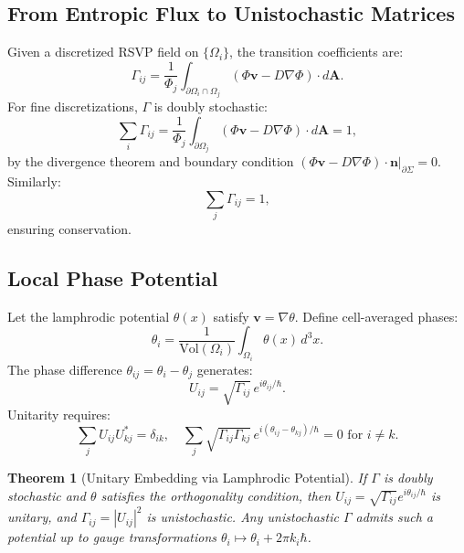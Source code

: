 \documentclass[12pt]{article}
\newtheorem{theorem}{Theorem}
\begin{document}
\subsection{From Entropic Flux to Unistochastic Matrices}

Given a discretized RSVP field on \(\{\Omega_i\}\), the transition coefficients are:
\[
\Gamma_{ij} = \frac{1}{\Phi_j} \int_{\partial \Omega_i \cap \Omega_j} (\Phi \mathbf{v} - D \nabla \Phi) \cdot d\mathbf{A}.
\]
For fine discretizations, \(\Gamma\) is doubly stochastic:
\[
\sum_i \Gamma_{ij} = \frac{1}{\Phi_j} \int_{\partial \Omega_j} (\Phi \mathbf{v} - D \nabla \Phi) \cdot d\mathbf{A} = 1,
\]
by the divergence theorem and boundary condition \((\Phi \mathbf{v} - D \nabla \Phi) \cdot \mathbf{n}|_{\partial \Sigma} = 0\). Similarly:
\[
\sum_j \Gamma_{ij} = 1,
\]
ensuring conservation.

\subsection{Local Phase Potential}

Let the lamphrodic potential \(\theta(x)\) satisfy \(\mathbf{v} = \nabla \theta\). Define cell-averaged phases:
\[
\theta_i = \frac{1}{\mathrm{Vol}(\Omega_i)} \int_{\Omega_i} \theta(x) \, d^3x.
\]
The phase difference \(\theta_{ij} = \theta_i - \theta_j\) generates:
\[
U_{ij} = \sqrt{\Gamma_{ij}} \, e^{i \theta_{ij} / \hbar}.
\]
Unitarity requires:
\[
\sum_j U_{ij} U_{kj}^* = \delta_{ik}, \quad \sum_j \sqrt{\Gamma_{ij} \Gamma_{kj}} \, e^{i (\theta_{ij} - \theta_{kj}) / \hbar} = 0 \text{ for } i \neq k.
\]

\begin{theorem}[Unitary Embedding via Lamphrodic Potential]
\label{thm:unitaryembedding}
If \(\Gamma\) is doubly stochastic and \(\theta\) satisfies the orthogonality condition, then \(U_{ij} = \sqrt{\Gamma_{ij}} e^{i \theta_{ij} / \hbar}\) is unitary, and \(\Gamma_{ij} = |U_{ij}|^2\) is unistochastic. Any unistochastic \(\Gamma\) admits such a potential up to gauge transformations \(\theta_i \mapsto \theta_i + 2\pi k_i \hbar\).
\end{theorem}
\end{document}
